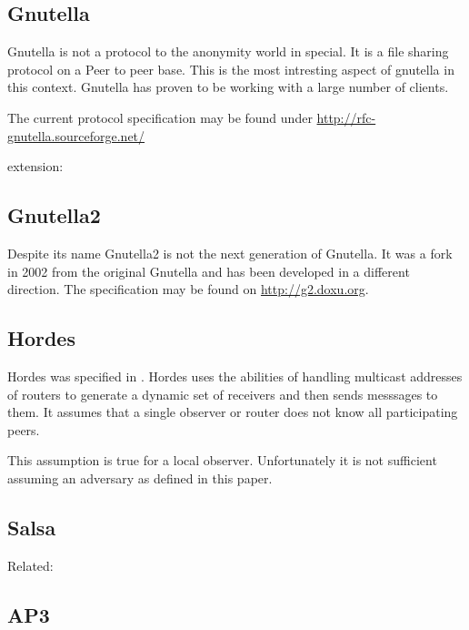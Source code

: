\subsection{Gnutella}
Gnutella is not a protocol to the anonymity world in special. It is a file sharing protocol on a Peer to peer base. This is the most intresting aspect of gnutella in this context. Gnutella has proven to be working with a large number of clients.

The current protocol specification may be found under \href{http://rfc-gnutella.sourceforge.net/developer/stable/index.html}{http://rfc-gnutella.sourceforge.net/}

extension: \cite{AthanRAM07}


\subsection{Gnutella2}
Despite its name Gnutella2 is not the next generation of Gnutella. It was a fork in 2002 from the original Gnutella and has been developed in a different direction. The specification may be found on \href{http://g2.doxu.org}{http://g2.doxu.org}.


\subsection{Hordes}
Hordes was specified in \cite{Levine:2002}. Hordes uses the abilities of handling multicast addresses of routers to generate a dynamic set of receivers and then sends messsages to them. It assumes that a single observer or router does not know all participating peers. 

This assumption is true for a local observer. Unfortunately it is not sufficient assuming an adversary as defined in this paper.

\subsection{Salsa}
\cite{Salsa}

Related: \cite{ccs2008:mittal}


\subsection{AP3}


